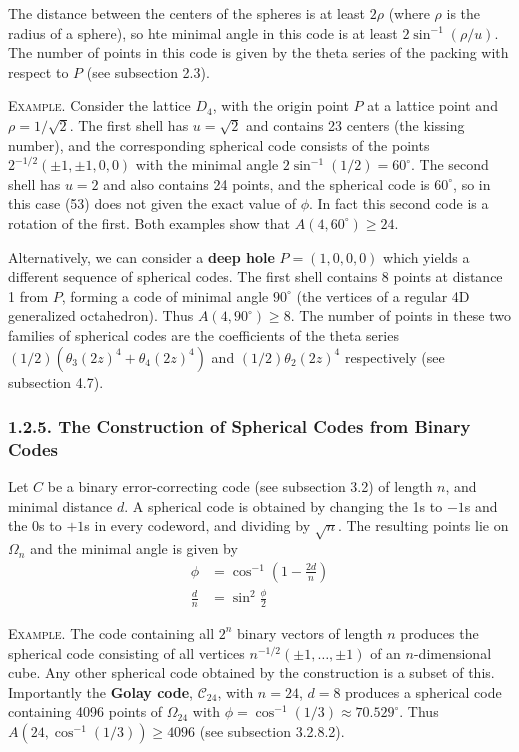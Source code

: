 \documentclass{article}
\renewcommand{\=}{\equiv}
\renewcommand{\i}{^{-1}}
\newcommand{\degrees}{^\circ}
\newcommand{\ass}[1]{\left( #1 \right)}
\newcommand{\Golay}{\mathcal{C}_{24}}
\newcommand{\header}[1]{\vspace{1em}\noindent\textsc{#1.} }
\begin{document}
The distance between the centers of the spheres is at least $2 \rho$ (where $\rho$ is the radius of a sphere), so hte minimal angle in this code is at least $2 \sin\i(\rho / u)$. The number of points in this code is given by the theta series of the packing with respect to $P$ (see subsection 2.3).

\header{Example}
Consider the lattice $D_4$, with the origin point $P$ at a lattice point and $\rho = 1/\sqrt{2}$.
The first shell has $u = \sqrt 2$ and contains 23 centers (the kissing number), and the corresponding spherical code consists of the points $2^{-1/2} (\pm 1, \pm 1, 0, 0)$ with the minimal angle $2 \sin\i (1/2) = 60\degrees$.
The second shell has $u = 2$ and also contains 24 points, and the spherical code is $60\degrees$, so in this case (53) does not given the exact value of $\phi$. In fact this second code is a rotation of the first.
Both examples show that $A(4, 60\degrees) \geq 24$.

Alternatively, we can consider a \textbf{deep hole} $P = (1,0,0,0)$ which yields a different sequence of spherical codes.
The first shell contains 8 points at distance 1 from $P$, forming a code of minimal angle $90\degrees$ (the vertices of a regular 4D generalized octahedron).
Thus $A(4, 90\degrees) \geq 8$.
The number of points in these two families of spherical codes are the coefficients of the theta series
$(1/2)( \theta_3 (2z)^4 + \theta_4 (2z)^4 )$ and $(1/2) \theta_2 (2z)^4$ respectively (see subsection 4.7).

\subsubsection*{1.2.5. The Construction of Spherical Codes from Binary Codes}

Let $C$ be a binary error-correcting code (see subsection 3.2) of length $n$, and minimal distance $d$.
A spherical code is obtained by changing the 1s to $-1$s and the 0s to $+1$s in every codeword, and dividing by $\sqrt n$. The resulting points lie on $\Omega_n$ and the minimal angle is given by
\begin{align*}
  \phi &= \cos\i\ass{ 1 - \frac{2d}{n} } \\
  \frac{d}{n} &= \sin^2 \frac{\phi}{2}
\end{align*}

\header{Example}
The code containing all $2^n$ binary vectors of length $n$ produces the spherical code consisting of all vertices $n^{-1/2}(\pm 1, \dots, \pm 1)$ of an $n$-dimensional cube. Any other spherical code obtained by the construction is a subset of this.
Importantly the \textbf{Golay code}, $\Golay$, with $n = 24$, $d = 8$ produces a spherical code containing 4096 points of $\Omega_{24}$ with $\phi = \cos\i(1/3) \approx 70.529\degrees$. Thus $A(24, \cos\i(1/3)) \geq 4096$ (see subsection 3.2.8.2).
\end{document}

